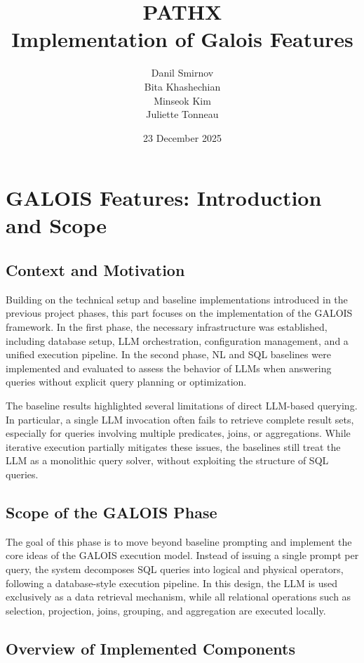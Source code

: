 \documentclass[11pt]{article}
\title{PATHX \\ \large Implementation of Galois Features}
\author{
    Danil Smirnov \\
    Bita Khashechian \\
    Minseok Kim \\
    Juliette Tonneau
}
\date{23 December 2025}
\begin{document}
\maketitle


\tableofcontents

\clearpage
\section{GALOIS Features: Introduction and Scope}

\subsection{Context and Motivation}

Building on the technical setup and baseline implementations introduced in the previous project phases, this part focuses on the implementation of the GALOIS framework. In the first phase, the necessary infrastructure was established, including database setup, LLM orchestration, configuration management, and a unified execution pipeline. In the second phase, NL and SQL baselines were implemented and evaluated to assess the behavior of LLMs when answering queries without explicit query planning or optimization.

The baseline results highlighted several limitations of direct LLM-based querying. In particular, a single LLM invocation often fails to retrieve complete result sets, especially for queries involving multiple predicates, joins, or aggregations. While iterative execution partially mitigates these issues, the baselines still treat the LLM as a monolithic query solver, without exploiting the structure of SQL queries.

\subsection{Scope of the GALOIS Phase}

The goal of this phase is to move beyond baseline prompting and implement the core ideas of the GALOIS execution model. Instead of issuing a single prompt per query, the system decomposes SQL queries into logical and physical operators, following a database-style execution pipeline. In this design, the LLM is used exclusively as a data retrieval mechanism, while all relational operations such as selection, projection, joins, grouping, and aggregation are executed locally.

\subsection{Overview of Implemented Components}
\end{document}

